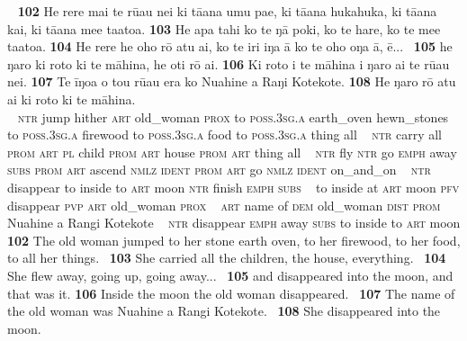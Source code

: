 ~
\newpage
\gll
\textbf{\textup{102}} He rere mai te rū{\ꞌ}au nei ki tā{\ꞌ}ana {\ꞌ}umu pae, ki tā{\ꞌ}ana hukahuka, ki tā{\ꞌ}ana kai, ki tā{\ꞌ}ana me{\ꞌ}e ta{\ꞌ}ato{\ꞌ}a. \textbf{\textup{103}} He {\ꞌ}apa tahi ko te ŋā poki, ko te hare, ko te me{\ꞌ}e ta{\ꞌ}ato{\ꞌ}a. \textbf{\textup{104}} He rere he oho rō atu {\ꞌ}ai, ko te iri iŋa {\ꞌ}ā ko te oho oŋa {\ꞌ}ā, ē... ~\textbf{\textup{105}} he ŋaro ki roto ki te māhina, he oti rō {\ꞌ}ai. \textbf{\textup{106}} Ki roto i te māhina i ŋaro ai te rū{\ꞌ}au nei. \textbf{\textup{107}} Te {\ꞌ}īŋoa o tou rū{\ꞌ}au era ko Nuahine {\ꞌ}a Raŋi Kotekote. \textbf{\textup{108}} He ŋaro rō atu {\ꞌ}ai ki roto ki te māhina.\\
~ \textsc{ntr} jump hither \textsc{art} old\_woman \textsc{prox} to \textsc{poss.3sg.a} earth\_oven hewn\_stones to \textsc{poss.3sg.a} firewood to \textsc{poss.3sg.a} food to \textsc{poss.3sg.a} thing all  ~ \textsc{ntr} carry all \textsc{prom} \textsc{art} \textsc{pl} child \textsc{prom} \textsc{art} house \textsc{prom} \textsc{art} thing all  ~ \textsc{ntr} fly \textsc{ntr} go \textsc{emph} away \textsc{subs} \textsc{prom} \textsc{art} ascend \textsc{nmlz} \textsc{ident} \textsc{prom} \textsc{art} go \textsc{nmlz} \textsc{ident} on\_and\_on ~ \textsc{ntr} disappear to inside to \textsc{art} moon \textsc{ntr} finish \textsc{emph} \textsc{subs}  ~ to inside at \textsc{art} moon \textsc{pfv} disappear \textsc{pvp} \textsc{art} old\_woman \textsc{prox}  ~ \textsc{art} name of \textsc{dem} old\_woman \textsc{dist} \textsc{prom} Nuahine a Rangi Kotekote  ~ \textsc{ntr} disappear \textsc{emph} away \textsc{subs} to inside to \textsc{art} moon\\

\medskip\glt
\textbf{\textup{102}} The old woman jumped to her stone earth oven, to her firewood, to her food, to all her things. ~\textbf{\textup{103}} She carried all the children, the house, everything. ~\textbf{\textup{104}} She flew away, going up, going away... ~\textbf{\textup{105}} and disappeared into the moon, and that was it. \textbf{\textup{106}} Inside the moon the old woman disappeared. ~\textbf{\textup{107}} The name of the old woman was Nuahine a Rangi Kotekote. ~\textbf{\textup{108}} She disappeared into the moon.


~

